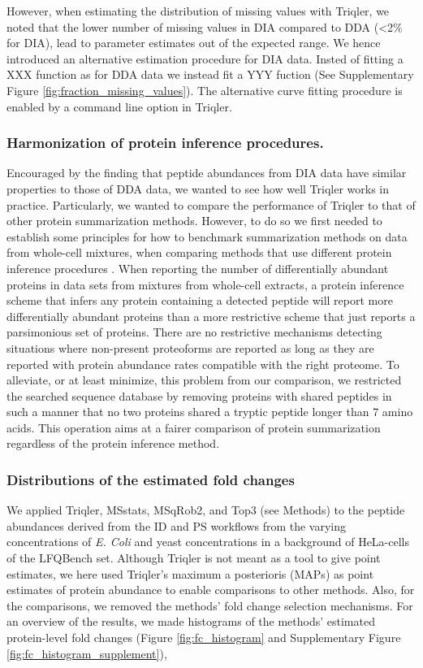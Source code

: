 \documentclass[10pt,letterpaper]{article}
\begin{document}
However, when estimating the distribution of missing values with Triqler, we noted that the lower number of missing values in DIA compared to DDA (<2\% for DIA), lead to parameter estimates out of the expected range. We hence introduced an alternative estimation procedure for DIA data. Insted of fitting a XXX function as for DDA data we instead fit a YYY fuction (See Supplementary Figure \ref{fig:fraction_missing_values}). The alternative curve fitting procedure is  enabled by a command line option in Triqler. 

\subsubsection*{Harmonization of protein inference procedures.}

Encouraged by the finding that peptide abundances from DIA data have similar properties to those of DDA data, we wanted to see how well Triqler works in practice. Particularly, we wanted to compare the performance of Triqler to that of other protein summarization methods. However, to do so we first needed to establish some principles for how to benchmark summarization methods on data from whole-cell mixtures, when comparing methods that use different protein inference procedures \cite{serang2012recognizing}. When reporting the number of differentially abundant proteins in data sets from mixtures from whole-cell extracts, a protein inference scheme that infers any protein containing a detected peptide will report more differentially abundant proteins than a more restrictive scheme that just reports a parsimonious set of proteins. There are no restrictive mechanisms detecting situations where non-present proteoforms are reported as long as they are reported with protein abundance rates compatible with the right proteome. To alleviate, or at least minimize, this problem from our comparison, we restricted the searched sequence database by removing proteins with shared peptides in such a manner that no two proteins shared a tryptic peptide longer than 7 amino acids. This operation aims at a fairer comparison of protein summarization regardless of the protein inference method. 

\subsubsection*{Distributions of the estimated fold changes}

We applied Triqler, MSstats, MSqRob2, and Top3 (see Methods) to the peptide abundances derived from the ID and PS workflows from the varying concentrations of {\em E. Coli} and yeast concentrations in a background of HeLa-cells of the LFQBench set. Although Triqler is not meant as a tool to give point estimates, we here used Triqler's maximum a posterioris (MAPs) as point estimates of protein abundance to enable comparisons to other methods. Also, for the comparisons, we removed the methods' fold change selection mechanisms. For an overview of the results, we made histograms of the methods' estimated protein-level fold changes (Figure \ref{fig:fc_histogram} and Supplementary Figure \ref{fig:fc_histogram_supplement}), 
\end{document}
